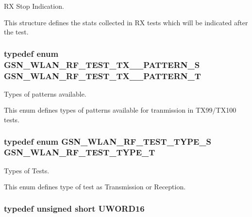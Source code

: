 RX Stop Indication. 

This structure defines the stats collected in RX tests which will be indicated after the test. \hypertarget{a00677_gaf2d0e783b6db5c93a78ee3d99153ebcb}{
\subsubsection[{GSN\_\-WLAN\_\-RF\_\-TEST\_\-TX\_\-99\_\-PATTERN\_\-T}]{\setlength{\rightskip}{0pt plus 5cm}typedef enum {\bf GSN\_\-WLAN\_\-RF\_\-TEST\_\-TX\_\_\-PATTERN\_\-S} {\bf GSN\_\-WLAN\_\-RF\_\-TEST\_\-TX\_\_\-PATTERN\_\-T}}}
\label{a00677_gaf2d0e783b6db5c93a78ee3d99153ebcb}


Types of patterns available. 

This enum defines types of patterns available for tranmission in TX99/TX100 tests. \hypertarget{a00677_ga58d933da4429968a4151ae6b2106281b}{
\subsubsection[{GSN\_\-WLAN\_\-RF\_\-TEST\_\-TYPE\_\-T}]{\setlength{\rightskip}{0pt plus 5cm}typedef enum {\bf GSN\_\-WLAN\_\-RF\_\-TEST\_\-TYPE\_\-S} {\bf GSN\_\-WLAN\_\-RF\_\-TEST\_\-TYPE\_\-T}}}
\label{a00677_ga58d933da4429968a4151ae6b2106281b}


Types of Tests. 

This enum defines type of test as Transmission or Reception. \hypertarget{a00677_ga9346f50cd1a0569efeb685f429a562ff}{
\subsubsection[{UWORD16}]{\setlength{\rightskip}{0pt plus 5cm}typedef unsigned short {\bf UWORD16}}}
\label{a00677_ga9346f50cd1a0569efeb685f429a562ff}


